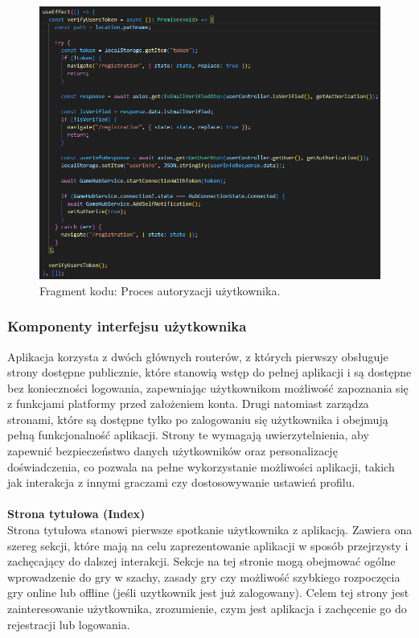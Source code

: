 \documentclass[12pt,a4paper]{article}
\begin{document}
\vspace{0.5cm}
\begin{figure}[h!]
    \centering
    \includegraphics[width=1\textwidth]{images/ex_router_authorization.png}
    \caption{Fragment kodu: Proces autoryzacji użytkownika.}
\end{figure}

\newpage

\subsubsection{Komponenty interfejsu użytkownika}

\noindent
Aplikacja korzysta z dwóch głównych routerów, z których pierwszy obsługuje strony dostępne publicznie, które stanowią wstęp do pełnej aplikacji i są dostępne bez konieczności logowania, zapewniając użytkownikom możliwość zapoznania się z funkcjami platformy przed założeniem konta. Drugi natomiast zarządza stronami, które są dostępne tylko po zalogowaniu się użytkownika i obejmują pełną funkcjonalność aplikacji. Strony te wymagają uwierzytelnienia, aby zapewnić bezpieczeństwo danych użytkowników oraz personalizację doświadczenia, co pozwala na pełne wykorzystanie możliwości aplikacji, takich jak interakcja z innymi graczami czy dostosowywanie ustawień profilu.
\\\\

\noindent \textbf{Strona tytułowa (Index)}\\
Strona tytułowa stanowi pierwsze spotkanie użytkownika z aplikacją. Zawiera ona szereg sekcji, które mają na celu zaprezentowanie aplikacji w sposób przejrzysty i zachęcający do dalszej interakcji. Sekcje na tej stronie mogą obejmować ogólne wprowadzenie do gry w szachy, zasady gry czy możliwość szybkiego rozpoczęcia gry online lub offline (jeśli uzytkownik jest już zalogowany). Celem tej strony jest zainteresowanie użytkownika, zrozumienie, czym jest aplikacja i zachęcenie go do rejestracji lub logowania.
\\
\end{document}
